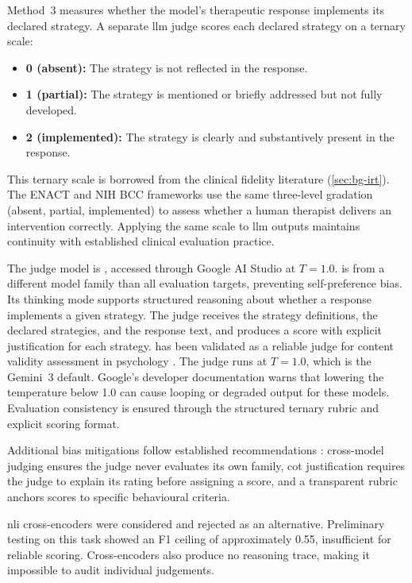 Method~3 measures whether the model's therapeutic response implements its
declared strategy. A separate \gls{llm} judge scores each declared strategy
on a ternary scale:

\begin{itemize}
  \item \textbf{0 (absent):} The strategy is not reflected in the response.
  \item \textbf{1 (partial):} The strategy is mentioned or briefly addressed
    but not fully developed.
  \item \textbf{2 (implemented):} The strategy is clearly and substantively
    present in the response.
\end{itemize}

This ternary scale is borrowed from the clinical fidelity literature
(\autoref{sec:bg-irt}). The ENACT \parencite{GYNNP2CC} and
NIH BCC \parencite{ITT882KN} frameworks use the same three-level
gradation (absent, partial, implemented) to assess whether a human therapist
delivers an intervention correctly. Applying the same scale to \gls{llm}
outputs maintains continuity with established clinical evaluation practice.

The judge model is , accessed through Google AI
Studio at $T = 1.0$.  is from a different model family
than all evaluation targets, preventing self-preference bias. Its thinking
mode supports structured reasoning about whether a response implements a
given strategy. The judge receives the strategy definitions, the declared
strategies, and the response text, and produces a score with explicit
justification for each strategy. 
 has been validated as a reliable judge for
content validity assessment in psychology \parencite{XQDRY83T}.
The judge runs at $T = 1.0$, which is the Gemini~3 default. Google's
developer documentation warns that lowering the temperature below 1.0
can cause looping or degraded output for these models. Evaluation
consistency is ensured through the structured ternary rubric and explicit
scoring format.


Additional bias mitigations follow established recommendations
\parencite{LVLA9LZU}: cross-model judging ensures the judge never evaluates
its own family, \gls{cot} justification requires the judge to explain its
rating before assigning a score, and a transparent rubric anchors scores
to specific behavioural criteria.

\gls{nli} cross-encoders were considered and rejected as an alternative.
Preliminary testing on this task showed an F1 ceiling of approximately
0.55, insufficient for reliable scoring. Cross-encoders also produce no
reasoning trace, making it impossible to audit individual judgements.

